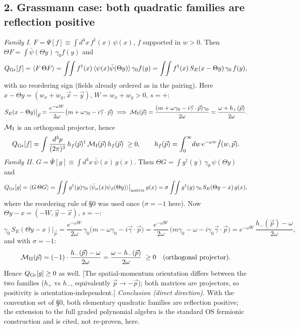\subsection*{2. Grassmann case: both quadratic families are
reflection positive}
\emph{Family I.}\;
$F=\Psi[f]\equiv\int d^4x\,f^\dagger(x)\,\psi(x)$, $f$ supported in
$w>0$.
Then $\Theta F=\int\bar\psi(\Theta y)\,\gamma_0 f(y)$ and
\[
Q_{\rm Gr}[f]=\langle F\,\Theta F\rangle
=\int\!\!\int f^\dagger(x)\,
\langle\psi(x)\bar\psi(\Theta y)\rangle\,\gamma_0 f(y)
=\int\!\!\int f^\dagger(x)\,S_E(x-\Theta y)\,\gamma_0\,f(y),
\]
with no reordering sign (fields already ordered as in the pairing).
Here $x-\Theta y=(w_x+w_y,\vec x-\vec y)$, $W=w_x+w_y>0$, $s=+$:
\[
S_E(x-\Theta y)\big|_{\vec p}
=\frac{e^{-\omega W}}{2\omega}
\bigl(m+\omega\gamma_0-i\vec\gamma\cdot\vec p\bigr)
\;\Longrightarrow\;
\mathcal M_{\rm I}(\vec p)
=\frac{(m+\omega\gamma_0-i\vec\gamma\cdot\vec p)\gamma_0}{2\omega}
=\frac{\omega+h_+(\vec p)}{2\omega}.
\]
$\mathcal M_{\rm I}$ is an orthogonal projector, hence
\[
Q_{\rm Gr}[f]
=\int\frac{d^3p}{(2\pi)^3}\,
h_f(\vec p)^\dagger\,\mathcal M_{\rm I}(\vec p)\,h_f(\vec p)\;\ge0,
\qquad
h_f(\vec p)=\int_0^\infty\!dw\,e^{-\omega w}\tilde f(w,\vec p).
\]
\emph{Family II.}\;
$G=\bar\Psi[g]\equiv\int d^4x\,\bar\psi(x)\,g(x)$.
Then $\Theta G=\int g^\dagger(y)\,\gamma_0\,\psi(\Theta y)$ and
\[
Q_{\rm Gr}[g]=\langle G\,\Theta G\rangle
=\int\!\!\int g^\dagger(y)\gamma_0\,
\langle\bar\psi_\alpha(x)\psi_\beta(\Theta y)\rangle
\big|_{\text{matrix}}\,g(x)
=\sigma\int\!\!\int g^\dagger(y)\,\gamma_0\,
S_E(\Theta y-x)\,g(x),
\]
where the reordering rule of \S0 was used once
($\sigma=-1$ here).
Now $\Theta y-x=(-W,\vec y-\vec x)$, $s=-$:
\[
\gamma_0\,S_E(\Theta y-x)\big|_{\vec p}
=\frac{e^{-\omega W}}{2\omega}\,
\gamma_0\bigl(m-\omega\gamma_0-i\vec\gamma\cdot\vec p\bigr)
=\frac{e^{-\omega W}}{2\omega}\,
\bigl(m\gamma_0-\omega-i\gamma_0\vec\gamma\cdot\vec p\bigr)
=e^{-\omega W}\,\frac{h_-(\vec p)-\omega}{2\omega},
\]
and with $\sigma=-1$:
\[
\mathcal M_{\rm II}(\vec p)
=(-1)\cdot\frac{h_-(\vec p)-\omega}{2\omega}
=\frac{\omega-h_-(\vec p)}{2\omega}\;\ge0
\quad(\text{orthogonal projector}).
\]
Hence $Q_{\rm Gr}[g]\ge0$ as well.
[The spatial-momentum orientation differs between the two families
($h_+$ vs $h_-$, equivalently $\vec p\to-\vec p$); both matrices
are projectors, so positivity is orientation-independent.]
\emph{Conclusion (direct direction).}
With the convention set of \S0, both elementary quadratic families
are reflection positive; the extension to the full graded
polynomial algebra is the standard OS fermionic construction and is
cited, not re-proven, here.

